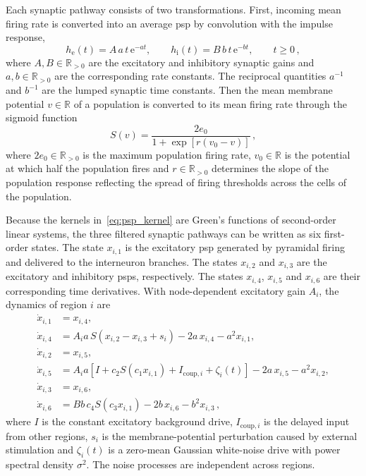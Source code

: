 Each synaptic pathway consists of two transformations.
First, incoming mean firing rate is converted into an average \ac{psp} by convolution with the impulse response,
%
\begin{equation}
    h_\mathrm{e}(t)=A\,a\,t\,\mathrm{e}^{-at},
    \qquad
    h_\mathrm{i}(t)=B\,b\,t\,\mathrm{e}^{-bt},
    \qquad t\geq 0\,,
    \label{eq:psp_kernel}
\end{equation}
%
where $A, B \in \mathbb{R}_{>0}$ are the excitatory and inhibitory synaptic gains and $a, b \in \mathbb{R}_{>0}$ are the corresponding rate constants.
The reciprocal quantities $a^{-1}$ and $b^{-1}$ are the lumped synaptic time constants.
Then the mean membrane potential $v \in \mathbb{R}$ of a population is converted to its mean firing rate through the sigmoid function
%
\begin{equation*}
    S(v)=\frac{2e_0}{1+\exp\!\left[r(v_0-v)\right]}\,,
\end{equation*}
%
where $2e_0 \in \mathbb{R}_{>0}$ is the maximum population firing rate, $v_0 \in \mathbb{R}$ is the potential at which half the population fires and $r \in \mathbb{R}_{>0}$ determines the slope of the population response reflecting the spread of firing thresholds across the cells of the population.

Because the kernels in~\eqref{eq:psp_kernel} are Green's functions of second-order linear systems, the three filtered synaptic pathways can be written as six first-order states.
The state $x_{i,1}$ is the excitatory \ac{psp} generated by pyramidal firing and delivered to the interneuron branches.
The states $x_{i,2}$ and $x_{i,3}$ are the excitatory and inhibitory \acp{psp}, respectively.
The states $x_{i,4}$, $x_{i,5}$ and $x_{i,6}$ are their corresponding time derivatives.
With node-dependent excitatory gain $A_i$, the dynamics of region $i$ are
%
\begin{align}
    \dot{x}_{i,1} &= x_{i,4}, \nonumber \\
    \dot{x}_{i,4} &= A_i a\,S\!\left(x_{i,2}-x_{i,3}+s_i\right)-2a\,x_{i,4}-a^2x_{i,1}, \nonumber \\
    \dot{x}_{i,2} &= x_{i,5}, \nonumber \\
    \dot{x}_{i,5} &= A_i a\left[I+c_2S\!\left(c_1x_{i,1}\right)+I_{\mathrm{coup},i}+\zeta_i(t)\right]
                     -2a\,x_{i,5}-a^2x_{i,2}, \label{eq:jr_node} \\
    \dot{x}_{i,3} &= x_{i,6}, \nonumber \\
    \dot{x}_{i,6} &= Bb\,c_4S\!\left(c_3x_{i,1}\right)-2b\,x_{i,6}-b^2x_{i,3}\,, \nonumber
\end{align}
%
where $I$ is the constant excitatory background drive, $I_{\mathrm{coup},i}$ is the delayed input from other regions, $s_i$ is the membrane-potential perturbation caused by external stimulation and $\zeta_i(t)$ is a zero-mean Gaussian white-noise drive with power spectral density $\sigma^2$.
The noise processes are independent across regions.

